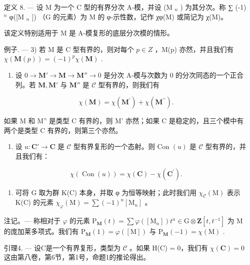 定义 8. --- 设 M 为一个 C 型的有界分次 A-模，并设 (M \(_{n}\) ) 为其分次。称 ∑ (-1) \(^{n}\) φ({[}M \(_{n}\) {]}) （G 的元素）为 M 的 φ-示性数，记作 χφ(M) 或简记为 χ(M)。

该定义特别适用于 M 是 A-模复形的底层分次模的情形。

例子. --- 3) 若 M 是 C 型有界的，则对每个 \(p \in Z\) ，M(p) 亦然，并且我们有 \(\chi(\mathbf{M}(p)) = (-1)^{p} \chi(\mathbf{M})\) .

\begin{enumerate}
\def\labelenumi{\arabic{enumi})}
\setcounter{enumi}{3}
\tightlist
\item
  设 \(0 \to \mathbf{M}' \to \mathbf{M} \to \mathbf{M}'' \to 0\) 是分次 A-模与次数为 0 的分次同态的一个正合列。若 \(\mathbf{M}, \mathbf{M}'\) 与 \(\mathbf{M}''\) 是 \(\mathcal{C}\) 型有界的，则我们有
\end{enumerate}

\[
\chi (\mathbf {M}) = \chi (\mathbf {M} ^ {\prime}) + \chi (\mathbf {M} ^ {\prime \prime}).
\]

如果 M 和 M'' 是类型 C 有界的，则 M' 亦然；如果 C 是稳定的，且三个模中有两个是类型 C 有界的，则第三个亦然。

\begin{enumerate}
\def\labelenumi{\arabic{enumi})}
\setcounter{enumi}{4}
\tightlist
\item
  设 \(u: \mathbf{C}' \to \mathbf{C}\) 是 \(\mathcal{C}\) 型有界复形的一个态射。则 Con \((u)\) 是 \(\mathcal{C}\) 型有界的，并且我们有：
\end{enumerate}

\[
\chi (\operatorname{Con} (u)) = \chi (\mathbf {C}) - \chi (\mathbf {C} ^ {\prime}).
\]

\begin{enumerate}
\def\labelenumi{\arabic{enumi})}
\setcounter{enumi}{5}
\tightlist
\item
  可将 G 取为群 K(C) 本身，并取 φ 为恒等映射；此时我们用 \(\chi_{\mathcal{C}}(\mathrm{M})\) 表示 K(C) 的元素 \(\chi_{\varphi}(\mathrm{M}) = \sum (-1)^{n}[\mathrm{M}_{n}]\) 。
\end{enumerate}

注记。--- 称相对于 \(\varphi\) 的元素 \(\mathrm{P}_{\mathbf{M}}(t) = \sum \varphi([\mathrm{M}_{n}]) t^{n} \in \mathrm{G} \otimes \mathbf{Z}[t, t^{-1}]\) 为 M 的庞加莱多项式。我们有 \(\mathrm{P}_{\mathbf{M}}(1) = \varphi([\mathrm{M}])\) 与 \(\mathrm{P}_{\mathbf{M}}(-1) = \chi(\mathrm{M})\) .

引理4. --- 设C是一个有界复形，类型为 \(\mathcal{C}\) 。如果 H(C) = 0，我们有 \(\chi(\mathbf{C}) = 0\) 这由第八卷，第6节，第1号，命题1的推论得出。

